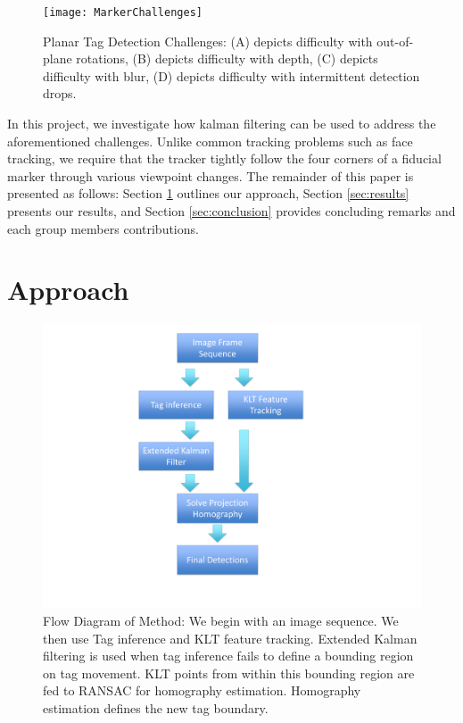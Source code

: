 \documentclass[letterpaper,10pt,conference]{IEEEtran}
\begin{document}
\begin{figure}
\centering
\texttt{[image: MarkerChallenges]}
\caption{Planar Tag Detection Challenges: (A) depicts difficulty with out-of-plane rotations, (B) depicts difficulty with depth, (C) depicts difficulty with blur, (D) depicts difficulty with intermittent detection drops.}
\label{fig:challenges}
\end{figure}

In this project, we investigate how kalman filtering can be used to address the aforementioned challenges. Unlike common tracking problems such as face tracking, we require that the tracker tightly follow the four corners of a fiducial marker through various viewpoint changes. The remainder of this paper is presented as follows: Section \ref{sec:approach} outlines our approach, Section \ref{sec:results} presents our results, and Section \ref{sec:conclusion} provides concluding remarks and each group members contributions.



\section{Approach}
\label{sec:approach}
\begin{figure}
\centering
\includegraphics[scale=.15]{flowchart.pdf}
\caption{Flow Diagram of Method: We begin with an image sequence. We then use Tag inference and KLT feature tracking. Extended Kalman filtering is used when tag inference fails to define a bounding region on tag movement. KLT points from within this bounding region are fed to RANSAC for homography estimation. Homography estimation defines the new tag boundary.}
\end{figure}
\end{document}
